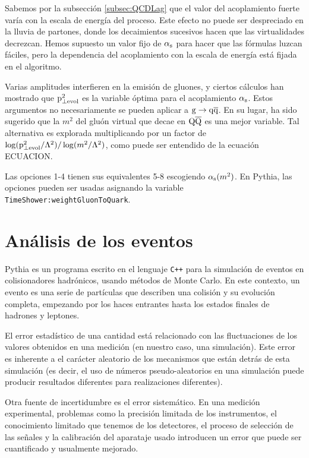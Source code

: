 \documentclass[a4paper,12pt]{article}
\begin{document}
Sabemos por la subsección \ref{subsec:QCDLag} que el valor del acoplamiento fuerte varía con la escala de energía del proceso. Este efecto no puede ser despreciado en la lluvia de partones, donde los decaimientos sucesivos hacen que las virtualidades decrezcan. Hemos supuesto un valor fijo de $\alpha_{\mathrm{s}}$ para hacer que las fórmulas luzcan fáciles, pero la dependencia del acoplamiento con la escala de energía está fijada en el algoritmo.

Varias amplitudes interfieren en la emisión de gluones, y ciertos cálculos han mostrado que ${\mathrm p}^2_{\perp\mathrm{evol}}$ es la variable óptima para el acoplamiento $\alpha_{\mathrm{s}}$. Estos argumentos no necesariamente se pueden aplicar a ${\mathrm g}\to{\mathrm q}\overline{\mathrm q}$. En su lugar, ha sido sugerido que la $m^2$ del gluón virtual que decae en ${\mathrm Q}\overline{\mathrm Q}$ es una mejor variable. Tal alternativa es explorada multiplicando por un factor de $\log({\mathrm p}^2_{\perp\mathrm{evol}}/\Lambda^2)/\log(m^2/\Lambda^2)$, como puede ser entendido de la ecuación ECUACION.

Las opciones 1-4 tienen sus equivalentes 5-8 escogiendo $\alpha_{\mathrm{s}}(m^2)$. En Pythia, las opciones pueden ser usadas asignando la variable \verb|TimeShower:weightGluonToQuark|.


\section{Análisis de los eventos}
\label{sec:analysis}

Pythia es un programa escrito en el lenguaje \verb|C++| para la simulación de eventos en colisionadores hadrónicos, usando métodos de Monte Carlo. En este contexto, un evento es una serie de partículas que describen una colisión y su evolución completa, empezando por los haces entrantes hasta los estados finales de hadrones y leptones.

El error estadístico de una cantidad está relacionado con las fluctuaciones de los valores obtenidos en una medición (en nuestro caso, una simulación). Este error es inherente a el carácter aleatorio de los mecanismos que están detrás de esta simulación (es decir, el uso de números pseudo-aleatorios en una simulación puede producir resultados diferentes para realizaciones diferentes).

Otra fuente de incertidumbre es el error sistemático. En una medición experimental, problemas como la precisión limitada de los instrumentos, el conocimiento limitado que tenemos de los detectores, el proceso de selección de las señales y la calibración del aparataje usado introducen un error que puede ser cuantificado y usualmente mejorado.
\end{document}
